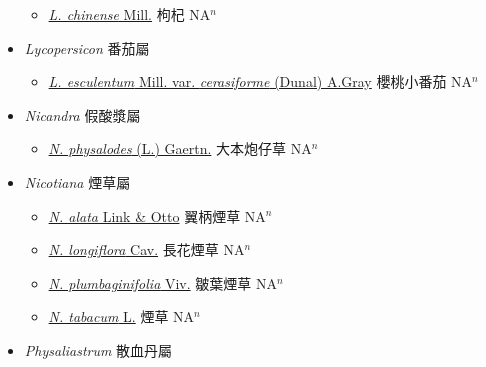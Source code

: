 \begin{itemize}
  \begin{itemize}
        \item[] \href{http://www.theplantlist.org/tpl1.1/search?q=Lycium+chinense}{\textit{L. chinense} Mill.}   枸杞 NA$^n$
  \end{itemize}
 \item[] \textit{Lycopersicon} 番茄屬
                    
  \begin{itemize}
        \item[] \href{http://www.theplantlist.org/tpl1.1/search?q=Lycopersicon+esculentum+var.+cerasiforme}{\textit{L. esculentum} Mill. var. \textit{cerasiforme} (Dunal) A.Gray}   櫻桃小番茄 NA$^n$
  \end{itemize}
 \item[] \textit{Nicandra} 假酸漿屬
                    
  \begin{itemize}
        \item[] \href{http://www.theplantlist.org/tpl1.1/search?q=Nicandra+physalodes}{\textit{N. physalodes} (L.) Gaertn.}   大本炮仔草 NA$^n$
  \end{itemize}
 \item[] \textit{Nicotiana} 煙草屬
                    
  \begin{itemize}
        \item[] \href{http://www.theplantlist.org/tpl1.1/search?q=Nicotiana+alata}{\textit{N. alata} Link \& Otto}   翼柄煙草 NA$^n$
        \item[] \href{http://www.theplantlist.org/tpl1.1/search?q=Nicotiana+longiflora}{\textit{N. longiflora} Cav.}   長花煙草 NA$^n$
        \item[] \href{http://www.theplantlist.org/tpl1.1/search?q=Nicotiana+plumbaginifolia}{\textit{N. plumbaginifolia} Viv.}   皺葉煙草 NA$^n$
        \item[] \href{http://www.theplantlist.org/tpl1.1/search?q=Nicotiana+tabacum}{\textit{N. tabacum} L.}   煙草 NA$^n$
  \end{itemize}
 \item[] \textit{Physaliastrum} 散血丹屬
                    

\end{itemize}
